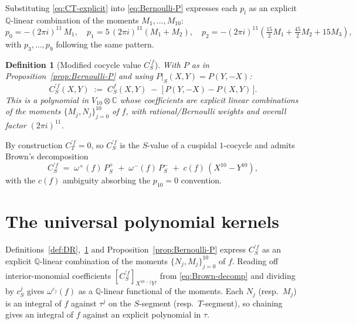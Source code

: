 \documentclass[11pt,letterpaper]{article}
\newtheorem{definition}[theorem]{Definition}
\newcommand{\QQ}{\mathbb{Q}}
\newcommand{\CC}{\mathbb{C}}
\newcommand{\eps}{\varepsilon}
\begin{document}
Substituting \eqref{eq:CT-explicit} into \eqref{eq:Bernoulli-P}
expresses each $p_l$ as an explicit $\QQ$-linear combination of the
moments $M_1, \ldots, M_{10}$:
\begin{equation}\label{eq:p-explicit}
  p_0 = -(2\pi i)^{11}\,M_1, \quad
  p_1 = 5\,(2\pi i)^{11}(M_1 + M_2), \quad
  p_2 = -(2\pi i)^{11}\!\left(\tfrac{15}{2}M_1 + \tfrac{45}{2}M_2 + 15 M_3\right),
\end{equation}
with $p_3, \ldots, p_9$ following the same pattern.

\begin{definition}[Modified cocycle value $C^{\prime f}_S$]\label{def:Cprime}
With $P$ as in Proposition~\ref{prop:Bernoulli-P} and using
$P|_S(X, Y) = P(Y, -X)$:
\begin{equation*}
  C^{\prime f}_S(X, Y) \;:=\; C^f_S(X, Y) \;-\; \bigl[\,P(Y, -X) - P(X, Y)\,\bigr].
\end{equation*}
This is a polynomial in $V_{10}\otimes\CC$ whose coefficients are
explicit linear combinations of the moments $\{M_j, N_j\}_{j=0}^{10}$ of
$f$, with rational/Bernoulli weights and overall factor $(2\pi i)^{11}$.
\end{definition}

By construction $C^{\prime f}_T = 0$, so $C^{\prime f}_S$ is the
$S$-value of a cuspidal $1$-cocycle and admits Brown's decomposition
\begin{equation}\label{eq:Brown-decomp}
  C^{\prime f}_S \;=\; \omega^+(f)\,P^+_S \;+\; \omega^-(f)\,P^-_S \;+\; c(f)\,(X^{10} - Y^{10}),
\end{equation}
with the $c(f)$ ambiguity absorbing the $p_{10} = 0$ convention.

\section{The universal polynomial kernels}\label{sec:kernels}

Definitions~\ref{def:DR},~\ref{def:Cprime} and
Proposition~\ref{prop:Bernoulli-P} express $C^{\prime f}_S$ as an
explicit $\QQ$-linear combination of the moments $\{N_j, M_j\}_{j=0}^{10}$
of $f$.  Reading off interior-monomial coefficients
$[C^{\prime f}_S]_{X^{10-j}Y^j}$ from \eqref{eq:Brown-decomp} and dividing
by $c_S^j$ gives $\omega^{\eps_j}(f)$ as a $\QQ$-linear functional of the
moments.  Each $N_j$ (resp.\ $M_j$) is an integral of $f$ against $\tau^j$
on the $S$-segment (resp.\ $T$-segment), so chaining gives an integral of
$f$ against an explicit polynomial in $\tau$.
\end{document}
